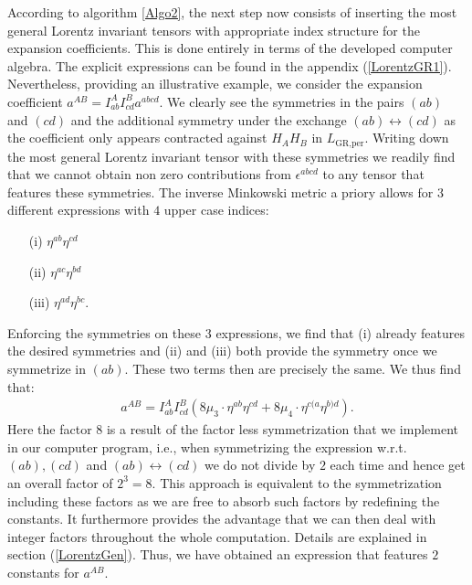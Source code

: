 According to algorithm \ref{Algo2}, the next step now consists of inserting the most general Lorentz invariant tensors with appropriate index structure for the expansion coefficients. This is done entirely in terms of the developed computer algebra. The explicit expressions can be found in the appendix (\ref{LorentzGR1}).
Nevertheless, providing an illustrative example, we consider the expansion coefficient $a^{AB} = I^{A}_{ab}I^{B}_{cd}a^{abcd}$. We clearly see the symmetries in the pairs $(ab)$ and $(cd)$ and the additional symmetry under the exchange $(ab) \leftrightarrow (cd)$ as the coefficient only appears contracted against $H_AH_B$ in $L_{\text{GR,per}}$. Writing down the most general Lorentz invariant tensor with these symmetries we readily find that we cannot obtain non zero contributions from $\epsilon^{abcd}$ to any tensor that features these symmetries. The inverse Minkowski metric a priory allows for $3$ different expressions with $4$ upper case indices:
\begin{itemize}
    \item[(i)] $\eta^{ab} \eta^{cd}$ 
    \item[(ii)] $\eta^{ac} \eta^{bd}$ 
    \item[(iii)] $\eta^{ad} \eta^{bc}$.
\end{itemize}
Enforcing the symmetries on these $3$ expressions, we find that (i) already features the desired symmetries and (ii) and (iii) both provide the symmetry once we symmetrize in $(ab)$. These two terms then are precisely the same. We thus find that:
\begin{align}\label{ansatzExample}
    a^{AB} = I^{A}_{ab}I^{B}_{cd} \left ( 8\mu_3 \cdot \eta^{ab}\eta^{cd} + 8\mu_4 \cdot \eta^{c(a} \eta^{b)d}   \right ).
\end{align}
Here the factor $8$ is a result of the factor less symmetrization that we implement in our computer program, i.e., when symmetrizing the expression w.r.t.\ $(ab),(cd)$ and $(ab) \leftrightarrow (cd) $ we do not divide by $2$ each time and hence get an overall factor of $2^3=8$. This approach is equivalent to the symmetrization including these factors as we are free to absorb such factors by redefining the constants. It furthermore provides the advantage that we can then deal with integer factors throughout the whole computation. Details are explained in section (\ref{LorentzGen}).
Thus, we have obtained an expression that features $2$ constants for $a^{AB}$.

